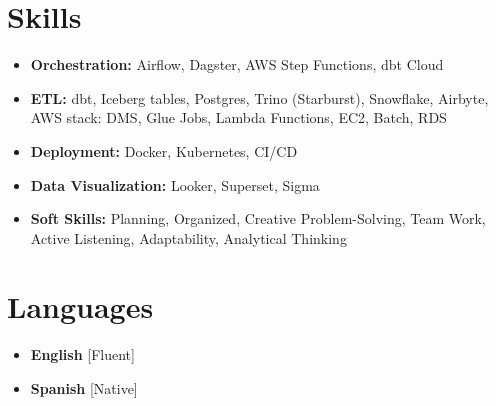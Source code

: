 \documentclass[11pt,a4paper,sans]{moderncv}
\begin{document}
\section{Skills}
{\begin{itemize}[label=\textbullet]
\setlength\itemsep{-0.2cm}
\item {\textbf{Orchestration:} Airflow, Dagster, AWS Step Functions, dbt Cloud}
\item {\textbf{ETL:} dbt, Iceberg tables, Postgres, Trino (Starburst), Snowflake, Airbyte, AWS stack: DMS, Glue Jobs, Lambda Functions, EC2, Batch, RDS}
\item {\textbf{Deployment:} Docker, Kubernetes, CI/CD}
\item {\textbf{Data Visualization:} Looker, Superset, Sigma }
\item {\textbf{Soft Skills:} Planning, Organized, Creative Problem-Solving, Team Work, Active Listening, Adaptability, Analytical Thinking}
\end{itemize}}
\vspace*{-8mm}
\section{Languages}
\begin{multicols}{2}
    \begin{itemize}[leftmargin=0.6cm, label=\textbullet, noitemsep]
    \item \textbf{English} [Fluent]
    \item {\textbf{Spanish} [Native]}
    \end{itemize}
\end{multicols}
\end{document}
